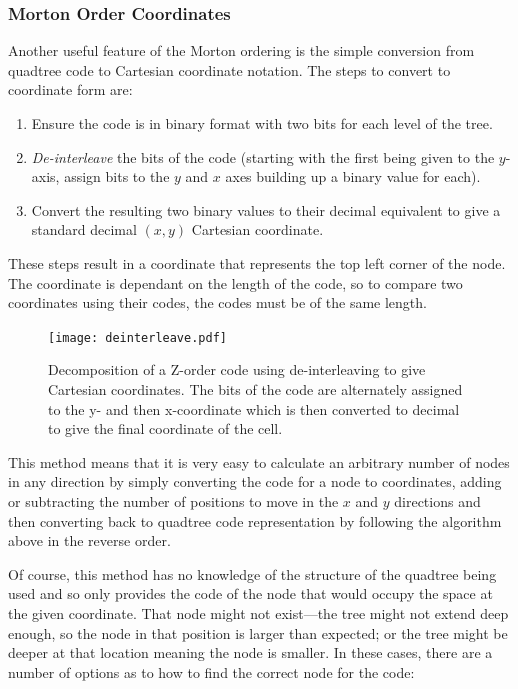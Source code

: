 \subsubsection*{Morton Order Coordinates}
\label{ssub:morton_order_coordinates}

Another useful feature of the Morton ordering is the simple conversion from
quadtree code to Cartesian coordinate notation. The steps to convert to
coordinate form are:

\begin{enumerate}
	\item Ensure the code is in binary format with two bits for each level of
		the tree.
	\item \emph{De-interleave} the bits of the code (starting with the first
		being given to the $y$-axis, assign bits to the $y$ and $x$ axes
		building up a binary value for each).
	\item Convert the resulting two binary values to their decimal equivalent
		to give a standard decimal $(x,y)$ Cartesian coordinate.
\end{enumerate}

These steps result in a coordinate that represents the top left corner of the
node. The coordinate is dependant on the length of the code, so to compare two
coordinates using their codes, the codes must be of the same length.

\begin{figure}[tbh]
	\centering
	\texttt{[image: deinterleave.pdf]}

	\caption[Decomposition of a Z-order code to give coordinates.]
		{Decomposition of a Z-order code using de-interleaving to give
		Cartesian coordinates. The bits of the code are alternately assigned to
		the y- and then x-coordinate which is then converted to decimal to give
		the final coordinate of the cell.}\label{fig:deinterleave}
\end{figure}

This method means that it is very easy to calculate an arbitrary number of
nodes in any direction by simply converting the code for a node to coordinates,
adding or subtracting the number of positions to move in the $x$ and $y$
directions and then converting back to quadtree code representation by
following the algorithm above in the reverse order.

Of course, this method has no knowledge of the structure of the quadtree being
used and so only provides the code of the node that would occupy the space at
the given coordinate. That node might not exist---the tree might not extend
deep enough, so the node in that position is larger than expected; or the tree
might be deeper at that location meaning the node is smaller. In these cases,
there are a number of options as to how to find the correct node for the code:

